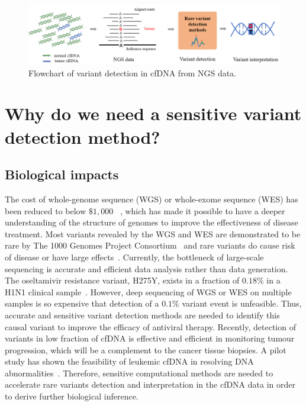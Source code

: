 \documentclass[a4,center,fleqn]{NAR}
\begin{document}
\begin{figure}[ht]
\centering
\includegraphics[width=1\textwidth]{flowchart.png}
\caption{Flowchart of variant detection in cfDNA from NGS data.}
\label{fig:flowchart}
\end{figure}


\section{Why do we need a sensitive variant detection method?}

\subsection{Biological impacts}

The cost of whole-genome sequence (WGS) or whole-exome sequence (WES) has been reduced to below $\$1,000$ ~\citep{caulfield2013reflections}, which has made it possible to have a deeper understanding of the structure of genomes to improve the effectiveness of disease treatment. 
Most variants revealed by the WGS and WES are demonstrated to be rare by The 1000 Genomes Project Consortium~\citep{10002010map} and rare variants do cause risk of disease or have large effects~\citep{koboldt2013next, kosmicki2016discovery, ng2010exome, keller2013mutations}.
Currently, the bottleneck of large-scale sequencing is accurate and efficient data analysis rather than data generation.
The oseltamivir resistance variant, H275Y, exists in a fraction of $0.18\%$ in a H1N1 clinical sample~\citep{Flaherty2012}.
However, deep sequencing of WGS or WES on multiple samples is so expensive that detection of a $0.1\%$ variant event is unfeasible.
Thus, accurate and sensitive variant detection methods are needed to identify this causal variant to improve the efficacy of antiviral therapy.
Recently, detection of variants in low fraction of cfDNA is effective and efficient in monitoring tumour progression, which will be a complement to the cancer tissue biopsies.
A pilot study has shown the feasibility of leukemic cfDNA in resolving DNA abnormalities~\citep{zhou2014pilot}.
Therefore, sensitive computational methods are needed to accelerate rare variants detection and interpretation in the cfDNA data in order to derive further biological inference.
\end{document}
